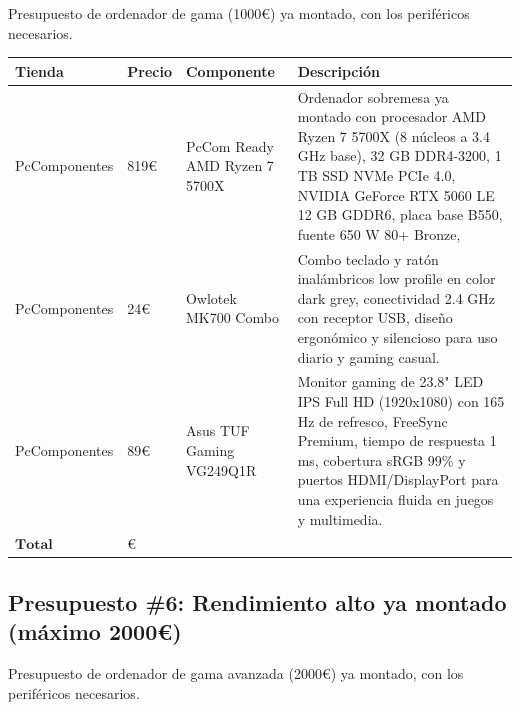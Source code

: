 \documentclass[spanish,openany]{report}
\begin{document}
Presupuesto de ordenador de gama  (1000\euro) ya montado, con los periféricos necesarios.


\begin{tabularx}{\linewidth}{|C{2.5cm}|Y|Y|Y|}
\hline
Tienda & Precio & Componente & Descripción \\
\hline
PcComponentes & 819\euro & PcCom Ready AMD Ryzen 7 5700X & Ordenador sobremesa ya montado con procesador AMD Ryzen 7 5700X (8 núcleos a 3.4 GHz base), 32 GB DDR4-3200, 1 TB SSD NVMe PCIe 4.0, NVIDIA GeForce RTX 5060 LE 12 GB GDDR6, placa base B550, fuente 650 W 80+ Bronze,  \\
\hline
PcComponentes & 24\euro & Owlotek MK700 Combo & Combo teclado y ratón inalámbricos low profile en color dark grey, conectividad 2.4 GHz con receptor USB, diseño ergonómico y silencioso para uso diario y gaming casual. \\
\hline
PcComponentes & 89\euro & Asus TUF Gaming VG249Q1R & Monitor gaming de 23.8" LED IPS Full HD (1920x1080) con 165 Hz de refresco, FreeSync Premium, tiempo de respuesta 1 ms, cobertura sRGB 99\% y puertos HDMI/DisplayPort para una experiencia fluida en juegos y multimedia. \\
\hline
\large{$\mathbf{Total}$} &    \\
\hline
\end{tabularx}
\clearpage
{}
\subsection*{Presupuesto \#6: Rendimiento alto ya montado (máximo 2000\euro)}

Presupuesto de ordenador de gama avanzada (2000\euro) ya montado, con los periféricos necesarios.
\end{document}
